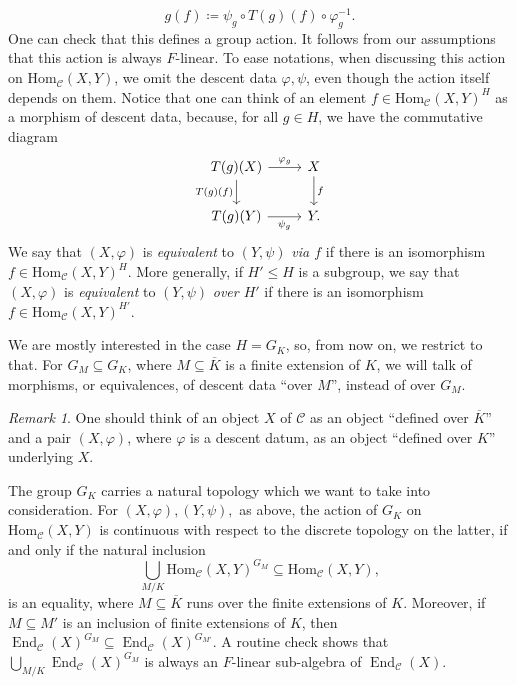 \documentclass[a4paper,10pt]{amsart}
\theoremstyle{plain}
\theoremstyle{definition}
\theoremstyle{remark}
\newtheorem{remark}[theorem]{Remark}
\def\mr#1{\mathrm{#1}}
\def\Ccal{\mathcal{C}}
\renewcommand{\hom}{\mr{Hom}}
\DeclareMathOperator{\End}{End}
\begin{document}
\[
    g(f) \coloneqq \psi_g \circ T(g)(f) \circ \varphi_g^{-1}.
\]
One can check that this defines a group action. It follows from our assumptions that this action is always \(F\)-linear. To ease notations, when discussing this action on \(\hom_{\Ccal}(X, Y)\), we omit the descent data \(\varphi, \psi\), even though the action itself depends on them. Notice that one can think of an element \(f \in \hom_{\Ccal}(X, Y)^{H}\) as a morphism of descent data, because, for all \(g \in H\), we have the commutative diagram
\[\begin{tikzcd}
	{T(g)(X)} & X \\
	{T(g)(Y)} & Y.
	\arrow["{\varphi_g}", from=1-1, to=1-2]
	\arrow["{T(g)(f)}"', from=1-1, to=2-1]
	\arrow["f", from=1-2, to=2-2]
	\arrow["{\psi_g}"', from=2-1, to=2-2]
\end{tikzcd}\]
We say that \((X, \varphi)\) is \emph{equivalent} to \((Y, \psi)\) \emph{via \(f\)} if there is an isomorphism \(f \in \hom_{\Ccal}(X, Y)^{H}\). More generally, if \(H' \le H\) is a subgroup, we say that \((X, \varphi)\) is \emph{equivalent} to \((Y, \psi)\) \emph{over \(H'\)} if there is an isomorphism \(f \in \hom_{\Ccal}(X, Y)^{H'}\).

We are mostly interested in the case \(H = G_K\), so, from now on, we restrict to that. For \(G_M \subseteq G_K\), where \(M\subseteq \overline{K}\) is a finite extension of \(K\), we will talk of morphisms, or equivalences, of descent data ``over \(M\)'', instead of over \(G_M\).
\begin{remark}
One should think of an object \(X\) of \(\Ccal\) as an object ``defined over \(\overline{K}\)'' and a pair \((X, \varphi)\), where \(\varphi\) is a descent datum, as an object ``defined over \(K\)'' underlying \(X\).
\end{remark}
The group \(G_K\) carries a natural topology which we want to take into consideration.
For \((X, \varphi),  (Y, \psi),\) as above, the action of \(G_K\) on \(\hom_\Ccal(X, Y)\) is continuous with respect to the discrete topology on the latter, if and only if the natural inclusion
\[
    \bigcup_{M/K} \hom_\Ccal(X, Y)^{G_M} \subseteq \hom_\Ccal (X, Y),
\]
is an equality, where \(M \subseteq \overline{K}\) runs over the finite extensions of \(K\).
Moreover, if \(M\subseteq M'\) is an inclusion of finite extensions of \(K\), then \(\End_{\Ccal}(X)^{G_M} \subseteq \End_{\Ccal}(X)^{G_{M'}}\). A routine check shows that \(\bigcup_{M/K} \End_\Ccal(X)^{G_M}\) is always an \(F\)-linear sub-algebra of \(\End_\Ccal(X)\).
\end{document}
